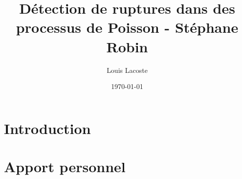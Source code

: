 \documentclass[a4paper,12pt]{article}
\title{Détection de ruptures dans des processus de Poisson - Stéphane Robin}
\author{Louis Lacoste}
\date{\today}
\begin{document}
\maketitle

\section{Introduction}

\section{Apport personnel}
\end{document}
